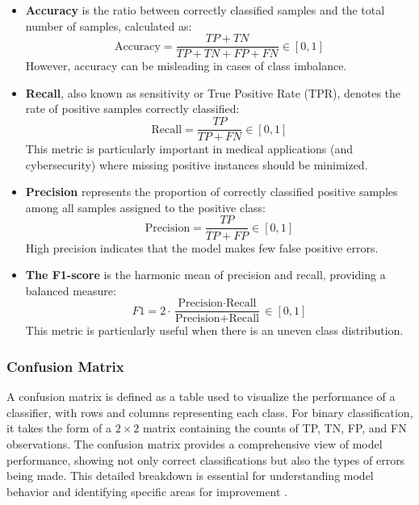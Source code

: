 \documentclass[12pt, a4paper]{report}
\begin{document}
\begin{itemize}
    \item \textbf{Accuracy} is the ratio between correctly classified samples and the total number of samples, calculated as:
    \begin{equation}
        \text{Accuracy} = \frac{TP + TN}{TP + TN + FP + FN} \in [0,1]
        \label{eq:accuracy}
    \end{equation}
    However, accuracy can be misleading in cases of class imbalance.

    \item \textbf{Recall}, also known as sensitivity or True Positive Rate (TPR), denotes the rate of positive samples correctly classified:
    \begin{equation}
        \text{Recall} = \frac{TP}{TP + FN} \in [0,1]
        \label{eq:recall}
    \end{equation}
    This metric is particularly important in medical applications (and cybersecurity) where missing positive instances should be minimized.

    \item \textbf{Precision} represents the proportion of correctly classified positive samples among all samples assigned to the positive class:
    \begin{equation}
        \text{Precision} = \frac{TP}{TP + FP} \in [0,1]
        \label{eq:precision}
    \end{equation}
    High precision indicates that the model makes few false positive errors.

    \item \textbf{The F1-score} is the harmonic mean of precision and recall, providing a balanced measure:
    \begin{equation}
        F1 = 2 \cdot \frac{\text{Precision} \cdot \text{Recall}}{\text{Precision} + \text{Recall}} \in [0,1]
        \label{eq:f1_score}
    \end{equation}
    This metric is particularly useful when there is an uneven class distribution.
\end{itemize}

\subsubsection{Confusion Matrix}
A confusion matrix is defined as a table used to visualize the performance of a classifier, with rows and columns representing each class. For binary classification, it takes the form of a $2 \times 2$ matrix containing the counts of TP, TN, FP, and FN observations. The confusion matrix provides a comprehensive view of model performance, showing not only correct classifications but also the types of errors being made. This detailed breakdown is essential for understanding model behavior and identifying specific areas for improvement .
\end{document}
